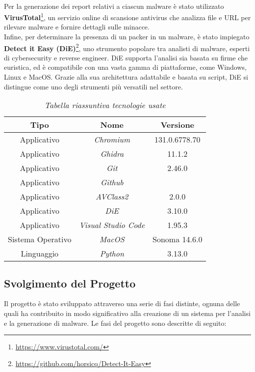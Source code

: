 \\  
Per la generazione dei report relativi a ciascun malware è stato utilizzato \textbf{VirusTotal}\footnote{\url{https://www.virustotal.com/}}, un servizio online di scansione antivirus che analizza file e URL per rilevare malware e fornire dettagli sulle minacce.  
\\  
Infine, per determinare la presenza di un packer in un malware, è stato impiegato \textbf{Detect it Easy (DiE)}\footnote{\url{https://github.com/horsicq/Detect-It-Easy}}, uno strumento popolare tra analisti di malware, esperti di cybersecurity e reverse engineer. DiE supporta l'analisi sia basata su firme che euristica, ed è compatibile con una vasta gamma di piattaforme, come Windows, Linux e MacOS. Grazie alla sua architettura adattabile e basata su script, DiE si distingue come uno degli strumenti più versatili nel settore.

\hfill
\begin{table}[!h]
    \centering
    \begin{tabular}{|c|c|c|}
        \hline
        \textbf{Tipo} & \textbf{Nome} & \textbf{Versione} \\
        \hline
        Applicativo & \emph{Chromium} & 131.0.6778.70 \\
        \hline
        Applicativo & \emph{Ghidra} & 11.1.2 \\
        \hline
        Applicativo & \emph{Git} & 2.46.0 \\
        \hline
        Applicativo & \emph{Github} &  \\
        \hline
        Applicativo & \emph{AVClass2} & 2.0.0 \\
        \hline
        Applicativo & \emph{DiE} & 3.10.0 \\
        \hline
        Applicativo & \emph{Visual Studio Code} & 1.95.3 \\
        \hline
        Sistema Operativo & \emph{MacOS} & Sonoma 14.6.0 \\
        \hline
        Linguaggio & \emph{Python} & 3.13.0 \\
        \hline
    \end{tabular}
    \vspace*{.2cm}
    \caption{\emph{Tabella riassuntiva tecnologie usate}}
    \label{table-tecnologie}
\end{table}

\subsection{Svolgimento del Progetto}
Il progetto è stato sviluppato attraverso una serie di fasi distinte, ognuna delle quali ha contribuito in modo significativo alla creazione di un sistema per l'analisi e la generazione di malware. Le fasi del progetto sono descritte di seguito:

